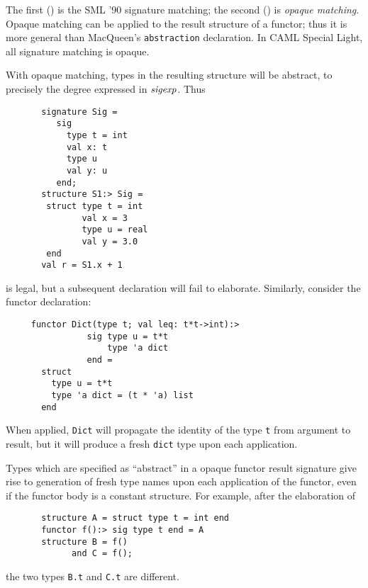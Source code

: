 The first (\boxml{:}) is the  SML '90 signature matching; 
the second (\boxml{:>}) is {\sl opaque matching}.
Opaque matching can be applied to the result structure of a functor;
thus it is more general than MacQueen's {\tt abstraction} declaration.
In CAML Special Light, all signature matching is opaque.


With opaque matching, types in the resulting
structure will be abstract, to precisely the degree expressed
in ${\it sigexp}$. Thus
\begin{verbatim}
       signature Sig = 
          sig 
            type t = int
            val x: t
            type u   
            val y: u 
          end;
       structure S1:> Sig = 
        struct type t = int
               val x = 3
               type u = real
               val y = 3.0
        end
       val r = S1.x + 1
\end{verbatim}
is legal, but a subsequent declaration 
will fail to elaborate. Similarly, consider the functor declaration:
\begin{verbatim}
     functor Dict(type t; val leq: t*t->int):> 
                sig type u = t*t 
                    type 'a dict       
                end =
       struct
         type u = t*t
         type 'a dict = (t * 'a) list
       end
\end{verbatim}
When applied, {\tt Dict} will propagate 
the identity of the type
{\tt t} from argument to result, but it will produce a fresh
{\tt dict} type upon each application. 

Types which are specified as ``abstract'' in a opaque functor
result signature give rise to generation of fresh type names
upon each application of the functor, even if the functor body
is a constant structure. For example, after the elaboration of 
\begin{verbatim}
       structure A = struct type t = int end
       functor f():> sig type t end = A
       structure B = f()
             and C = f();
\end{verbatim}
the two types {\tt B.t} and {\tt C.t} are different.


